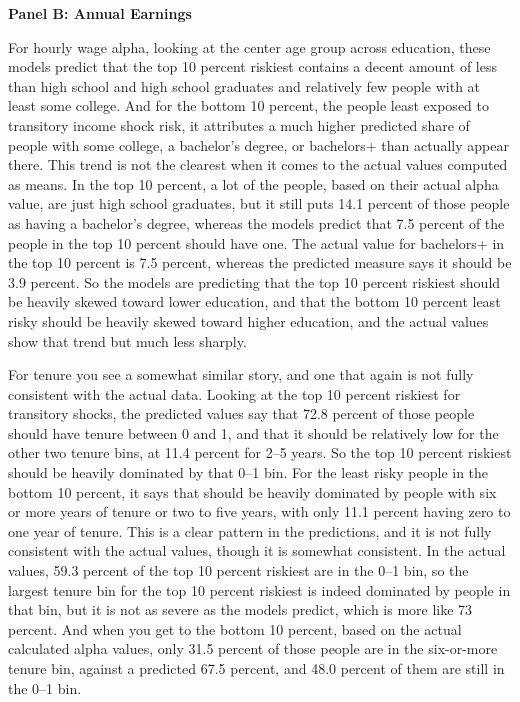 \documentclass[12pt]{article}
\begin{document}
\begin{onehalfspace}
\begin{table}[H]
    \vspace{10pt}

    \textbf{Panel B: Annual Earnings}\\[4pt]
    \resizebox*{!}{0.41\textheight}{%
        
    }
\end{table}

For hourly wage alpha, looking at the center age group across education, these models predict that the top 10 percent riskiest contains a decent amount of less than high school and high school graduates and relatively few people with at least some college. And for the bottom 10 percent, the people least exposed to transitory income shock risk, it attributes a much higher predicted share of people with some college, a bachelor's degree, or bachelors+ than actually appear there. This trend is not the clearest when it comes to the actual values computed as means. In the top 10 percent, a lot of the people, based on their actual alpha value, are just high school graduates, but it still puts 14.1 percent of those people as having a bachelor's degree, whereas the models predict that 7.5 percent of the people in the top 10 percent should have one. The actual value for bachelors+ in the top 10 percent is 7.5 percent, whereas the predicted measure says it should be 3.9 percent. So the models are predicting that the top 10 percent riskiest should be heavily skewed toward lower education, and that the bottom 10 percent least risky should be heavily skewed toward higher education, and the actual values show that trend but much less sharply.

For tenure you see a somewhat similar story, and one that again is not fully consistent with the actual data. Looking at the top 10 percent riskiest for transitory shocks, the predicted values say that 72.8 percent of those people should have tenure between 0 and 1, and that it should be relatively low for the other two tenure bins, at 11.4 percent for 2--5 years. So the top 10 percent riskiest should be heavily dominated by that 0--1 bin. For the least risky people in the bottom 10 percent, it says that should be heavily dominated by people with six or more years of tenure or two to five years, with only 11.1 percent having zero to one year of tenure. This is a clear pattern in the predictions, and it is not fully consistent with the actual values, though it is somewhat consistent. In the actual values, 59.3 percent of the top 10 percent riskiest are in the 0--1 bin, so the largest tenure bin for the top 10 percent riskiest is indeed dominated by people in that bin, but it is not as severe as the models predict, which is more like 73 percent. And when you get to the bottom 10 percent, based on the actual calculated alpha values, only 31.5 percent of those people are in the six-or-more tenure bin, against a predicted 67.5 percent, and 48.0 percent of them are still in the 0--1 bin.


\end{onehalfspace}
\end{document}
